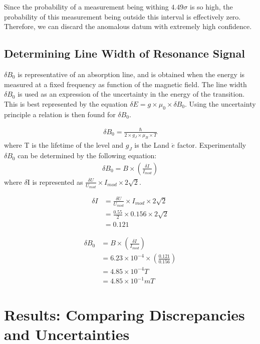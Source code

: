 \documentclass[a4paper]{article}
\begin{document}
\qq Since the probability of a measurement being withing $4.49 \sigma$
is so high, the probability of this measurement being outside this
interval is effectively zero. Therefore, we can discard the anomalous
datum with extremely high confidence.

\subsection{Determining Line Width of Resonance Signal}
\qq $\delta B_0$ is representative of an absorption line, and is
obtained when the energy is measured at a fixed frequency as function
of the magnetic field. The line width $\delta B_0$ is used as an
expression of the uncertainty in the energy of the transition. This is
best represented by the equation $\delta E = g \times \mu_0 \times
\delta B_0$. Using the uncertainty principle a relation is then found
for $\delta B_0$.

\begin{align*}
\delta B_0 = \frac{\hbar}{2 \times g_J \times \mu_B \times T}
\end{align*}
where T is the lifetime of the level and $g_J$ is the Land $\acute{e}$
factor. Experimentally $\delta B_0$ can be determined by the following equation:
\begin{align*}
\delta B_0 = B \times \left( \frac{\delta I}{I_{mod}} \right)
\end{align*}
where $\delta$I is represented as $\frac{\delta U}{U_{mod}} \times  I_{mod} \times 2\sqrt{2}$.

\begin{align*}
\delta I &= \frac{\delta U}{U_{mod}} \times  I_{mod} \times 2\sqrt{2} \\
         &= \frac{0.55}{2} \times 0.156 \times 2\sqrt{2} \\
         &= 0.121
\end{align*}

\begin{align*}
\delta B_0 &= B \times \left( \frac {\delta I} {I_{mod}} \right) \\
           &= 6.23 \times 10^{-4} \times \left( \frac {0.121} {0.156} \right) \\
           &= 4.85 \times 10^{-4} T \\
           &= 4.85 \times 10^{-1} mT
\end{align*}

\section{Results: Comparing Discrepancies and Uncertainties}
\qq
\end{document}
